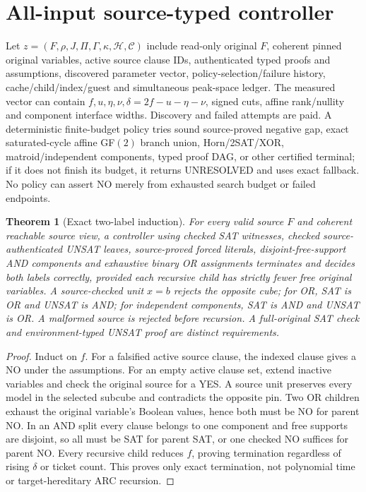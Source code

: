 \documentclass[11pt]{article}
\newtheorem{theorem}{Theorem}
\begin{document}
\section{All-input source-typed controller}
Let $z=(F,\rho,J,\Pi,\Gamma,\kappa,\mathcal H,\mathcal C)$ include read-only original $F$, coherent pinned original variables, active source clause IDs, authenticated typed proofs and assumptions, discovered parameter vector, policy-selection/failure history, cache/child/index/guest and simultaneous peak-space ledger. The measured vector can contain $f,u,\eta,\nu,\delta=2f-u-\eta-\nu$, signed cuts, affine rank/nullity and component interface widths. Discovery and failed attempts are paid. A deterministic finite-budget policy tries sound source-proved negative gap, exact saturated-cycle affine GF$(2)$ branch union, Horn/2SAT/XOR, matroid/independent components, typed proof DAG, or other certified terminal; if it does not finish its budget, it returns UNRESOLVED and uses exact fallback. No policy can assert NO merely from exhausted search budget or failed endpoints.
\begin{theorem}[Exact two-label induction]
For every valid source $F$ and coherent reachable source view, a controller using checked SAT witnesses, checked source-authenticated UNSAT leaves, source-proved forced literals, disjoint-free-support AND components and exhaustive binary OR assignments terminates and decides both labels correctly, provided each recursive child has strictly fewer free original variables. A source-checked unit $x=b$ rejects the opposite cube; for OR, SAT is OR and UNSAT is AND; for independent components, SAT is AND and UNSAT is OR. A malformed source is rejected before recursion. A full-original SAT check and environment-typed UNSAT proof are distinct requirements.
\end{theorem}
\begin{proof}
Induct on $f$. For a falsified active source clause, the indexed clause gives a NO under the assumptions. For an empty active clause set, extend inactive variables and check the original source for a YES. A source unit preserves every model in the selected subcube and contradicts the opposite pin. Two OR children exhaust the original variable's Boolean values, hence both must be NO for parent NO. In an AND split every clause belongs to one component and free supports are disjoint, so all must be SAT for parent SAT, or one checked NO suffices for parent NO. Every recursive child reduces $f$, proving termination regardless of rising $\delta$ or ticket count. This proves only exact termination, not polynomial time or target-hereditary ARC recursion.
\end{proof}
\end{document}
